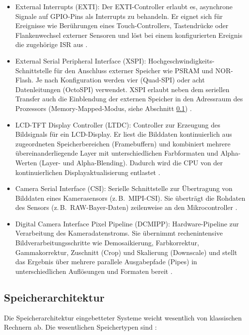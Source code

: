 \begin{itemize}
    \item External Interrupts (EXTI): Der EXTI-Controller erlaubt es, asynchrone Signale auf GPIO-Pins als Interrupts zu behandeln. Er eignet sich für Ereignisse wie Berührungen eines Touch-Controllers, Tastendrücke oder Flankenwechsel externer Sensoren und löst bei einem konfigurierten Ereignis die zugehörige ISR aus \cite[Kap. 7]{yiuDefinitiveGuideARM2013}.
    \item External Serial Peripheral Interface (XSPI): Hochgeschwindigkeits-Schnittstelle für den Anschluss externer Speicher wie PSRAM und NOR-Flash. Je nach Konfiguration werden vier (Quad-SPI) oder acht Datenleitungen (OctoSPI) verwendet. XSPI erlaubt neben dem seriellen Transfer auch die Einblendung der externen Speicher in den Adressraum des Prozessors (Memory-Mapped-Modus, siehe Abschnitt \ref{sub:speicherarchitektur}) \cite[S. 1288]{rm0486, STM32N6570DKProductSTMicroelectronics}.
    \item LCD-TFT Display Controller (LTDC): Controller zur Erzeugung des Bildsignals für ein LCD-Display. Er liest die Bilddaten kontinuierlich aus zugeordneten Speicherbereichen (Framebuffern) und kombiniert mehrere übereinanderliegende Layer mit unterschiedlichen Farbformaten und Alpha-Werten (Layer- und Alpha-Blending). Dadurch wird die CPU von der kontinuierlichen Displayaktualisierung entlastet \cite[S. 2093]{rm0486}.
    \item Camera Serial Interface (CSI): Serielle Schnittstelle zur Übertragung von Bilddaten eines Kamerasensors (z.\,B.\ MIPI-CSI). Sie überträgt die Rohdaten des Sensors (z.\,B.\ RAW-Bayer-Daten) zeilenweise an den Mikrocontroller \cite[S. 2015]{rm0486}.
    \item Digital Camera Interface Pixel Pipeline (DCMIPP): Hardware-Pipeline zur Verarbeitung des Kameradatenstroms. Sie übernimmt rechenintensive Bildverarbeitungsschritte wie Demosaikierung, Farbkorrektur, Gammakorrektur, Zuschnitt (Crop) und Skalierung (Downscale) und stellt das Ergebnis über mehrere parallele Ausgabepfade (Pipes) in unterschiedlichen Auflösungen und Formaten bereit \cite[S. 1815]{rm0486}.

\end{itemize}

\subsection{Speicherarchitektur}\label{sub:speicherarchitektur}

Die Speicherarchitektur eingebetteter Systeme weicht wesentlich von klassischen Rechnern ab. Die wesentlichen Speichertypen sind \cite{STM32N6570DKProductSTMicroelectronics, rm0486}:

